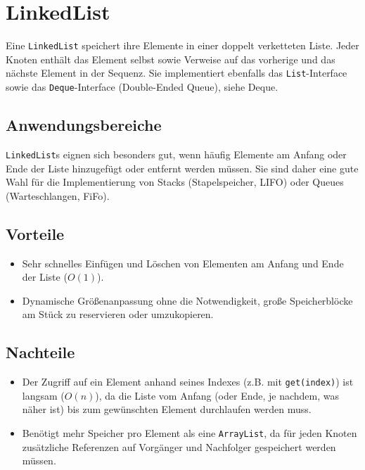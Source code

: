 \section{LinkedList}
Eine \texttt{LinkedList} speichert ihre Elemente in einer doppelt verketteten
Liste. Jeder Knoten enthält das Element selbst sowie Verweise auf das vorherige
und das nächste Element in der Sequenz. Sie implementiert ebenfalls das
\texttt{List}-Interface sowie das \texttt{Deque}-Interface (Double-Ended
Queue), siehe \gls{Deque}.

\subsection{Anwendungsbereiche}
\texttt{LinkedList}s eignen sich besonders gut, wenn häufig Elemente am Anfang oder Ende der Liste hinzugefügt oder entfernt werden müssen. Sie sind daher eine gute Wahl für die Implementierung von Stacks (\gls{Stapelspeicher}, \gls{LIFO}) oder Queues (Warteschlangen, \gls{FiFo}).

\subsection{Vorteile}
\begin{itemize}
    \item Sehr schnelles Einfügen und Löschen von Elementen am Anfang und Ende der Liste
          ($O(1)$).
    \item Dynamische Größenanpassung ohne die Notwendigkeit, große Speicherblöcke am
          Stück zu reservieren oder umzukopieren.
\end{itemize}

\subsection{Nachteile}
\begin{itemize}
    \item Der Zugriff auf ein Element anhand seines Indexes (z.B. mit
          \texttt{get(index)}) ist langsam ($O(n)$), da die Liste vom Anfang (oder Ende,
          je nachdem, was näher ist) bis zum gewünschten Element durchlaufen werden muss.
    \item Benötigt mehr Speicher pro Element als eine \texttt{ArrayList}, da für jeden
          Knoten zusätzliche Referenzen auf Vorgänger und Nachfolger gespeichert werden
          müssen.
\end{itemize}

